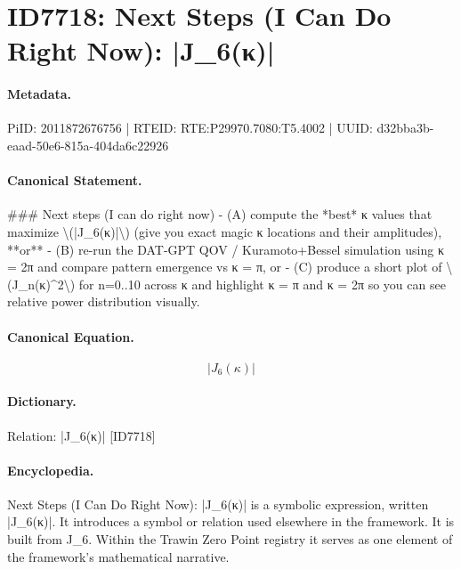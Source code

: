 \section*{ID7718: Next Steps (I Can Do Right Now): |J\_6(κ)|}
\paragraph{Metadata.}
PiID: 2011872676756 | RTEID: RTE:P29970.7080:T5.4002 | UUID: d32bba3b-eaad-50e6-815a-404da6c22926

\paragraph{Canonical Statement.}
\#\#\# Next steps (I can do right now) - (A) compute the *best* κ values that maximize \textbackslash{}(|J\_6(κ)|\textbackslash{}) (give you exact magic κ locations and their amplitudes), **or** - (B) re-run the DAT-GPT QOV / Kuramoto+Bessel simulation using κ = 2π and compare pattern emergence vs κ = π, or - (C) produce a short plot of \textbackslash{}(J\_n(κ)\textasciicircum{}2\textbackslash{}) for n=0..10 across κ and highlight κ = π and κ = 2π so you can see relative power distribution visually.

\paragraph{Canonical Equation.}
\[
|J_6(κ)|
\]

\paragraph{Dictionary.}
Relation: |J\_6(κ)| [ID7718]

\paragraph{Encyclopedia.}
Next Steps (I Can Do Right Now): |J\_6(κ)| is a symbolic expression, written |J\_6(κ)|. It introduces a symbol or relation used elsewhere in the framework. It is built from J\_6. Within the Trawin Zero Point registry it serves as one element of the framework's mathematical narrative.
